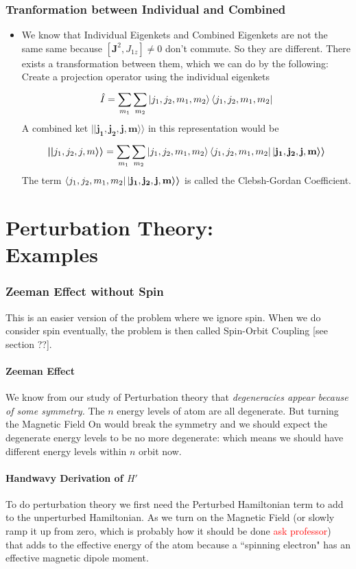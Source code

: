 \documentclass[10pt]{article}
\renewcommand{\vec}{\mathbf}
\renewcommand{\vec}{\mathbf}
\begin{document}
\section*{Tranformation between Individual and Combined} 
\begin{itemize}
	\item We know that Individual Eigenkets and Combined Eigenkets are not the same same because $[\vec{J}^2 , J_{1z}] \neq 0$ don't commute. So they are different. There exists a transformation between them, which we can do by the following: Create a projection operator using the individual eigenkets 
		\[
		\hat{I} = \sum_{m_1}^{} \sum_{m_2} \ket{j_1, j_2, m_1, m_2} \bra{j_1, j_2 , m_1, m_2}
		\] 
		A combined ket $\boldsymbol{| | }\mathbf{ j_1, j_2, j , m }\boldsymbol{\rangle\rangle} $ in this representation would be 
		\[
		\boldsymbol{| | } j_1, j_2, j , m \boldsymbol{\rangle\rangle} = 
 \sum_{m_1}^{} \sum_{m_2} \ket{j_1, j_2, m_1, m_2} 
 \bra{j_1, j_2 , m_1, m_2}
 | \mathbf{j_1, j_2, j , m } \boldsymbol{\rangle\rangle} 
		\] 
The term $ 
 \bra{j_1, j_2 , m_1, m_2}
 | \mathbf{j_1, j_2, j , m } \boldsymbol{\rangle\rangle}  $ is called the Clebsh-Gordan Coefficient. 
\end{itemize}
\part{Perturbation Theory: \\Examples} 
\section*{Zeeman Effect without Spin} 
This is an easier version of the problem where we ignore spin. When we do consider spin eventually, the problem is then called Spin-Orbit Coupling [see section ??]. 

\subsection*{Zeeman Effect} 
We know from our study of Perturbation theory that \emph{degeneracies appear because of some symmetry.} The $n$ energy levels of atom are all degenerate. But turning the Magnetic Field On would break the symmetry and we should expect the degenerate energy levels to be no more degenerate: which means we should have different energy levels within $n$ orbit now. 

\subsection*{Handwavy Derivation of $H'$ }
To do perturbation theory we first need the Perturbed Hamiltonian term to add to the unperturbed Hamiltonian. As we turn on the Magnetic Field (or slowly ramp it up from zero, which is probably how it should be done \textcolor{red}{ask professor}) that adds to the effective energy of the atom because a ``spinning electron" has an effective magnetic dipole moment. 
\end{document}
